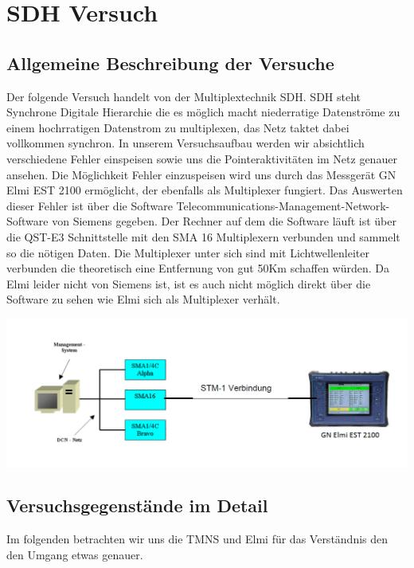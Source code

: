 
\chapter{SDH Versuch}
\section{Allgemeine Beschreibung der Versuche}
Der folgende Versuch handelt von der Multiplextechnik SDH. SDH steht Synchrone Digitale Hierarchie die es möglich macht niederratige Datenströme zu einem hochrratigen Datenstrom zu multiplexen, das Netz taktet dabei vollkommen synchron. In unserem Versuchsaufbau werden wir absichtlich verschiedene Fehler einspeisen sowie uns die Pointeraktivitäten im Netz genauer ansehen. Die Möglichkeit Fehler einzuspeisen wird uns durch das Messgerät GN Elmi EST 2100 ermöglicht, der ebenfalls als Multiplexer fungiert. Das Auswerten dieser Fehler ist über die Software Telecommunications-Management-Network-Software von Siemens gegeben. Der Rechner auf dem die Software läuft ist über die QST-E3 Schnittstelle mit den SMA 16 Multiplexern verbunden und sammelt so die nötigen Daten. 
Die Multiplexer unter sich sind mit Lichtwellenleiter verbunden die theoretisch eine Entfernung von gut 50Km schaffen würden. Da Elmi leider nicht von Siemens ist, ist es auch nicht möglich direkt über die Software zu sehen wie Elmi sich als Multiplexer verhält.

\includegraphics[scale=1]{sdh/versuchsaufbau.png} 

\section{Versuchsgegenstände im Detail}
Im folgenden betrachten wir uns die TMNS und Elmi für das Verständnis den den Umgang etwas genauer.

